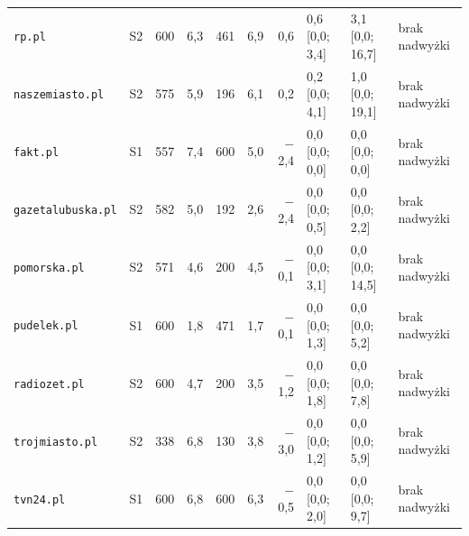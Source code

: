 \begin{landscape}
\begin{longtable}{@{}l c r r r r r l l l@{}}
\texttt{rp.pl} & S2 & 600 & 6,3 & 461 & 6,9 & 0,6 & 0,6 [0,0; 3,4] & 3,1 [0,0; 16,7] & brak nadwyżki \\
\texttt{naszemiasto.pl} & S2 & 575 & 5,9 & 196 & 6,1 & 0,2 & 0,2 [0,0; 4,1] & 1,0 [0,0; 19,1] & brak nadwyżki \\
\texttt{fakt.pl} & S1 & 557 & 7,4 & 600 & 5,0 & $-$2,4 & 0,0 [0,0; 0,0] & 0,0 [0,0; 0,0] & brak nadwyżki \\
\texttt{gazetalubuska.pl} & S2 & 582 & 5,0 & 192 & 2,6 & $-$2,4 & 0,0 [0,0; 0,5] & 0,0 [0,0; 2,2] & brak nadwyżki \\
\texttt{pomorska.pl} & S2 & 571 & 4,6 & 200 & 4,5 & $-$0,1 & 0,0 [0,0; 3,1] & 0,0 [0,0; 14,5] & brak nadwyżki \\
\texttt{pudelek.pl} & S1 & 600 & 1,8 & 471 & 1,7 & $-$0,1 & 0,0 [0,0; 1,3] & 0,0 [0,0; 5,2] & brak nadwyżki \\
\texttt{radiozet.pl} & S2 & 600 & 4,7 & 200 & 3,5 & $-$1,2 & 0,0 [0,0; 1,8] & 0,0 [0,0; 7,8] & brak nadwyżki \\
\texttt{trojmiasto.pl} & S2 & 338 & 6,8 & 130 & 3,8 & $-$3,0 & 0,0 [0,0; 1,2] & 0,0 [0,0; 5,9] & brak nadwyżki \\
\texttt{tvn24.pl} & S1 & 600 & 6,8 & 600 & 6,3 & $-$0,5 & 0,0 [0,0; 2,0] & 0,0 [0,0; 9,7] & brak nadwyżki \\
\end{longtable}
\end{landscape}
